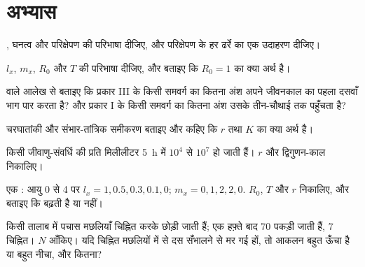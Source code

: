 \section{अभ्यास}

\begin{exercise}[$\star$]\label{exo:b1:populations:1}
, घनत्व और परिक्षेपण की परिभाषा दीजिए, और परिक्षेपण के हर ढर्रे का
एक उदाहरण दीजिए।
\end{exercise}

\begin{exercise}[$\star$]\label{exo:b1:populations:2}
$l_x$, $m_x$, $R_0$ और $T$ की परिभाषा दीजिए, और बताइए कि $R_0 = 1$ का क्या अर्थ है।
\end{exercise}

\begin{exercise}[$\star$]\label{exo:b1:populations:3}
 वाले आलेख से बताइए कि प्रकार III के किसी समवर्ग का कितना अंश
अपने जीवनकाल का पहला दसवाँ भाग पार करता है? और प्रकार I के किसी समवर्ग
का कितना अंश उसके तीन-चौथाई तक पहुँचता है?
\end{exercise}

\begin{exercise}[$\star$]\label{exo:b1:populations:4}
चरघातांकी और संभार-तांत्रिक समीकरण बताइए और कहिए कि $r$ तथा $K$ का क्या
अर्थ है।
\end{exercise}

\begin{exercise}[$\star\star$]\label{exo:b1:populations:5}
किसी जीवाणु-संवर्धि की प्रति मिलीलीटर  \qty{5}{h} में $10^4$ से
$10^7$ हो जाती हैं। $r$ और द्विगुणन-काल निकालिए।
\end{exercise}

\begin{exercise}[$\star\star$]\label{exo:b1:populations:6}
एक : आयु 0 से 4 पर $l_x = 1, 0.5, 0.3, 0.1, 0$; $m_x = 0,
1, 2, 2, 0$. $R_0$, $T$ और $r$ निकालिए, और बताइए कि  बढ़ती है या
नहीं।
\end{exercise}

\begin{exercise}[$\star\star$]\label{exo:b1:populations:7}
किसी तालाब में पचास मछलियाँ चिह्नित करके छोड़ी जाती हैं; एक हफ़्ते बाद 70
पकड़ी जाती हैं, 7 चिह्नित। $N$ आँकिए। यदि चिह्नित मछलियों में से दस
सँभालने से मर गई हों, तो आकलन बहुत ऊँचा है या बहुत नीचा, और कितना?
\end{exercise}

